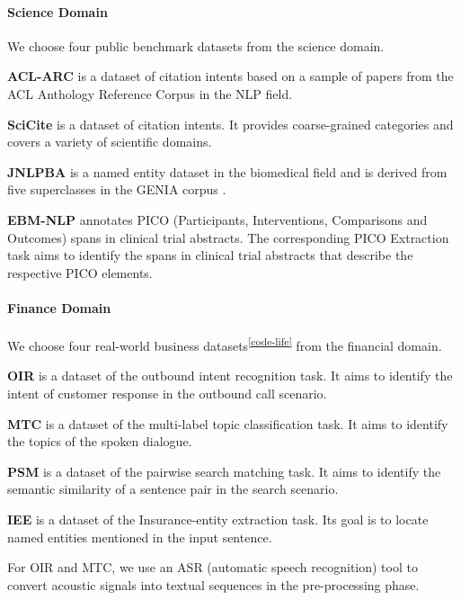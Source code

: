 \documentclass[11pt]{article}
\begin{document}
\paragraph{Science Domain}
We choose four public benchmark datasets from the science domain.

\textbf{ACL-ARC} \cite{DBLP:journals/tacl/JurgensKHMJ18}
is a dataset of citation intents based on a
sample of papers from the ACL Anthology Reference Corpus \cite{DBLP:conf/lrec/BirdDDGJKLPRT08} in the NLP field. 

\textbf{SciCite} \cite{DBLP:conf/naacl/CohanAZC19} is a dataset of citation intents. 
It provides coarse-grained categories and covers a variety of scientific domains.

\textbf{JNLPBA} \cite{DBLP:conf/bionlp/CollierK04}
is a named entity dataset in the biomedical field and is derived from five superclasses in the GENIA corpus \cite{kim2003genia}.

\textbf{EBM-NLP} \cite{DBLP:conf/acl/NenkovaLYMWNP18} annotates PICO (Participants, Interventions, Comparisons and Outcomes) spans in clinical trial abstracts. The corresponding PICO Extraction task aims to identify the spans in clinical trial abstracts that describe the respective PICO elements.

\paragraph{Finance Domain}
We choose four real-world business datasets\textsuperscript{\ref{code-life}} from the 
financial domain.


\textbf{OIR} is a dataset of the outbound intent recognition task. It aims to identify the intent of customer response in the outbound call scenario. 

\textbf{MTC} is a dataset of the multi-label topic classification task. It aims to identify the topics of the spoken dialogue. 

\textbf{PSM} is a dataset of the pairwise search matching task. It aims to identify the semantic similarity of a sentence pair in the search scenario.


\textbf{IEE} is a dataset of the Insurance-entity extraction task. Its goal is to locate named entities mentioned in the input sentence.

For OIR and MTC, we use an ASR (automatic speech recognition) tool to convert acoustic signals into textual sequences in the pre-processing phase.
\end{document}
